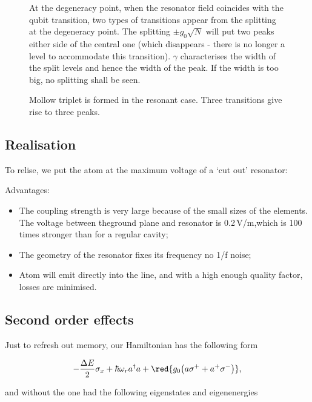 \begin{figure}
  \caption{At the degeneracy point, when the resonator field coincides with the qubit transition, two types of transitions appear
    from the splitting at the degeneracy point. The splitting $ \pm g_0\sqrt{N} $ will put two peaks either side of the central
    one (which disappears - there is no longer a level to accommodate this transition). $ \gamma $ characterises the width of the
    split levels and hence the width of the peak. If the width is too big, no splitting shall be seen.\label{qrDegen2}}
\end{figure}

\begin{figure}
  \caption{Mollow triplet is formed in the resonant case. Three transitions give rise to three peaks.\label{qrMollow}}
\end{figure}
\newpage
\subsection{Realisation}
To relise, we put the atom at the maximum voltage of a `cut out' resonator:

 Advantages:
\begin{itemize}
\item The coupling strength is very large because of the small sizes of the elements. The voltage between theground plane and
  resonator is 0.2\,V/m,which is 100 times stronger than for a regular cavity;
\item The geometry of the resonator fixes its frequency \ra no 1/f noise;
\item Atom will emit directly into the line, and with a high enough quality factor, losses are minimised.
\end{itemize}

\subsection{Second order effects}
Just to refresh out memory, our Hamiltonian has the following form

\begin{equation}\label{sec}
  -\frac{\Delta E}{2}\sigma_x + \hbar\omega_ra^{\dagger}a + \red{g_0\big(a\sigma^{+}+a^{+}\sigma^{-}\big)},
\end{equation}

\noindent and without the  one had the following eigenstates and eigenenergies

